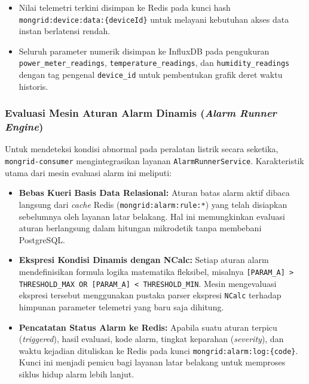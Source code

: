 \begin{enumerate}[label=\arabic*., leftmargin=*, itemsep=0pt]
  \begin{itemize}[leftmargin=*, itemsep=0pt]
    \item Nilai telemetri terkini disimpan ke Redis pada kunci hash \texttt{mongrid:device:data:\{deviceId\}} untuk melayani kebutuhan akses data instan berlatensi rendah.
    \item Seluruh parameter numerik disimpan ke InfluxDB pada pengukuran \texttt{power\_meter\_readings}, \texttt{temperature\_readings}, dan \texttt{humidity\_readings} dengan tag pengenal \texttt{device\_id} untuk pembentukan grafik deret waktu historis.
  \end{itemize}
\end{enumerate}

\subsubsection{Evaluasi Mesin Aturan Alarm Dinamis (\textit{Alarm Runner Engine})}

Untuk mendeteksi kondisi abnormal pada peralatan listrik secara seketika, \texttt{mongrid-consumer} mengintegrasikan layanan \texttt{AlarmRunnerService}. Karakteristik utama dari mesin evaluasi alarm ini meliputi:

\begin{itemize}[leftmargin=*, itemsep=0pt]
  \item \textbf{Bebas Kueri Basis Data Relasional:} Aturan batas alarm aktif dibaca langsung dari \textit{cache} Redis (\texttt{mongrid:alarm:rule:*}) yang telah disiapkan sebelumnya oleh layanan latar belakang. Hal ini memungkinkan evaluasi aturan berlangsung dalam hitungan mikrodetik tanpa membebani PostgreSQL.
  \item \textbf{Ekspresi Kondisi Dinamis dengan NCalc:} Setiap aturan alarm mendefinisikan formula logika matematika fleksibel, misalnya \texttt{[PARAM\_A] > THRESHOLD\_MAX OR [PARAM\_A] < THRESHOLD\_MIN}. Mesin mengevaluasi ekspresi tersebut menggunakan pustaka parser ekspresi \texttt{NCalc} terhadap himpunan parameter telemetri yang baru saja dihitung.
  \item \textbf{Pencatatan Status Alarm ke Redis:} Apabila suatu aturan terpicu (\textit{triggered}), hasil evaluasi, kode alarm, tingkat keparahan (\textit{severity}), dan waktu kejadian dituliskan ke Redis pada kunci \texttt{mongrid:alarm:log:\{code\}}. Kunci ini menjadi pemicu bagi layanan latar belakang untuk memproses siklus hidup alarm lebih lanjut.
\end{itemize}

